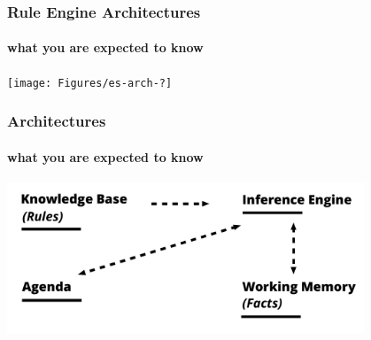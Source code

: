 \documentclass[xcolor={usenames,dvipsnames,svgnames}, compress]{beamer}
\begin{document}
\begin{frame}
  \frametitle{Rule Engine Architectures}
  \framesubtitle{what you are expected to know}
  \begin{center}
    \texttt{[image: Figures/es-arch-?]}
  \end{center}
\end{frame}

\begin{frame}
  \frametitle{Architectures}
  \framesubtitle{what you are expected to know}
  \begin{center}
    \includegraphics[width=0.8\textwidth]{Figures/es-arch}
  \end{center}
  
\end{frame}
\end{document}

